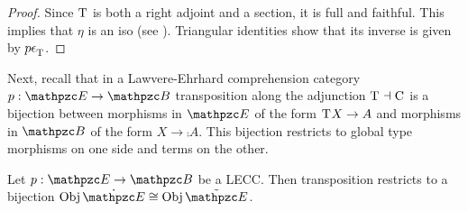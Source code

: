 \documentclass{lmcs} %
\theoremstyle{plain}\newtheorem{satz}[thm]{Satz} %
\begin{document}
\begin{proof}
	Since $\mathrm{T}^{}$ is both a right adjoint and a section, it is full and faithful. This implies that $\eta$ is an iso (see \cite[Lemma ~4.5.13]{riehl2017category}). Triangular identities show that its inverse is given by $p\epsilon_\term{}$.
\end{proof}

Next, recall that in a Lawvere-Ehrhard comprehension category $p : \ct{E}\to\ct{B}$ 
transposition along the adjunction $\mathrm{T}^{} \dashv \mathrm{C}^{}$ is a bijection between morphisms in $\ct{E}$ of the form $\mathrm{T}^{}X\to A$ and morphisms in $\ct{B}$ of the form $X\to\comp{}A$. This bijection restricts to global type morphisms on one side and terms on the other.

			\begin{lem}\label{lem:prf-trm}
				Let $p:\ct{E}\to\ct{B}$ be a LECC. Then transposition restricts to a bijection $\Obj\tcat{\ct{E}}\cong\Obj\gtcat{\ct{E}}$.
			\end{lem}
			
\end{document}
